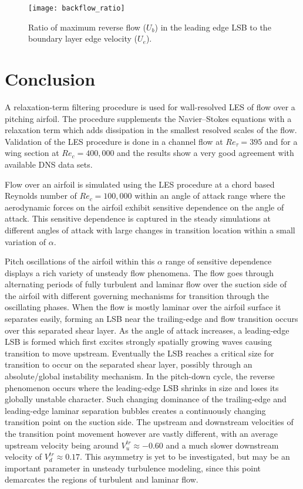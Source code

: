 \begin{figure}
	\centering
	\texttt{[image: backflow\_ratio]}
	\caption{Ratio of maximum reverse flow ($U_{b}$) in the leading edge LSB to the boundary layer edge velocity ($U_{e}$).} 
	\label{fig:backflow_ratio}
\end{figure}

\section{Conclusion}

A relaxation-term filtering procedure is used for wall-resolved LES of flow over a pitching airfoil. The procedure supplements the Navier--Stokes equations with a relaxation term which adds dissipation in the smallest resolved scales of the flow. Validation of the LES procedure is done in a channel flow at $Re_{\tau}=395$ and for a wing section at $Re_{c}=400,000$ and the results show a very good agreement with available DNS data sets.

Flow over an airfoil is simulated using the LES procedure at a chord based Reynolds number of $Re_{c}=100,000$ within an angle of attack range where the aerodynamic forces on the airfoil exhibit sensitive dependence on the angle of attack. This sensitive dependence is captured in the steady simulations at different angles of attack with large changes in transition location within a small variation of $\alpha$.

Pitch oscillations of the airfoil within this $\alpha$ range of sensitive dependence displays a rich variety of unsteady flow phenomena. The flow goes through alternating periods of fully turbulent and laminar flow over the suction side of the airfoil with different governing mechanisms for transition through the oscillating phases. When the flow is mostly laminar over the airfoil surface it separates easily, forming an LSB near the trailing-edge and flow transition  occurs over this separated shear layer. As the angle of attack increases, a leading-edge LSB is formed which first excites strongly spatially growing waves causing transition to move upstream. Eventually the LSB reaches a critical size for transition to occur on the separated shear layer, possibly through an absolute/global instability mechanism. In the pitch-down cycle, the reverse phenomenon occurs where the leading-edge LSB shrinks in size and loses its globally unstable character. Such changing dominance of the trailing-edge and leading-edge laminar separation bubbles creates a continuously changing transition point on the suction side. The upstream and downstream velocities of the transition point movement however are vastly different, with an average upstream velocity being around $V^{tr}_{u}\approx-0.60$ and a much slower downstream velocity of $V^{tr}_{d}\approx0.17$. This asymmetry is yet to be investigated, but may be an important parameter in unsteady turbulence modeling, since this point demarcates the regions of turbulent and laminar flow.

